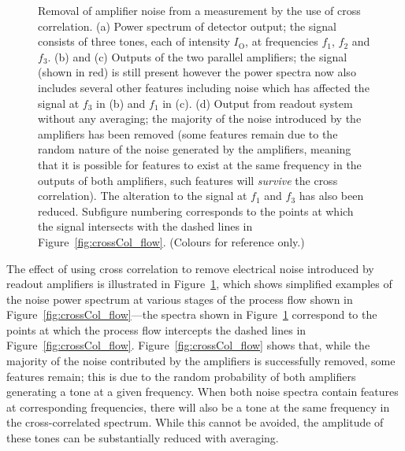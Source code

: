 \begin{figure}[p]
\begin{center}
\caption[Removal of amplifier noise from a measurement by the use of cross correlation.]{Removal of amplifier noise from a measurement by the use of cross correlation. (a) Power spectrum of detector output; the signal consists of three tones, each of intensity $I_{\mathrm{O}}$, at frequencies $f_{1}$, $f_{2}$ and $f_{3}$. (b) and (c) Outputs of the two parallel amplifiers; the signal (shown in red) is still present however the power spectra now also includes several other features including noise which has affected the signal at $f_{3}$ in (b) and $f_{1}$ in (c). (d) Output from readout system without any averaging; the majority of the noise introduced by the amplifiers has been removed (some features remain due to the random nature of the noise generated by the amplifiers, meaning that it is possible for features to exist at the same frequency in the outputs of both amplifiers, such features will \textit{survive} the cross correlation). The alteration to the signal at $f_{1}$ and $f_{3}$ has also been reduced. Subfigure numbering corresponds to the points at which the signal intersects with the dashed lines in Figure~\ref{fig:crossCol_flow}. (Colours for reference only.)}
\label{fig:crossColNoiseEx}
\end{center}
\end{figure} 
The effect of using cross correlation to remove electrical noise introduced by readout amplifiers is illustrated in Figure~\ref{fig:crossColNoiseEx}, which shows simplified examples of the noise power spectrum at various stages of the process flow shown in Figure~\ref{fig:crossCol_flow}---the spectra shown in Figure~\ref{fig:crossColNoiseEx} correspond to the points at which the process flow intercepts the dashed lines in Figure~\ref{fig:crossCol_flow}. Figure~\ref{fig:crossCol_flow} shows that, while the majority of the noise contributed by the amplifiers is successfully removed, some features remain; this is due to the random probability of both amplifiers generating a tone at a given frequency. When both noise spectra contain features at corresponding frequencies, there will also be a tone at the same frequency in the cross-correlated spectrum. While this cannot be avoided, the amplitude of these tones can be substantially reduced with averaging.
\par 
